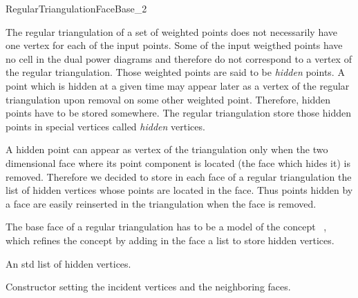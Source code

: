 

\begin{ccRefConcept}{RegularTriangulationFaceBase_2}


\ccDefinition
  
The regular triangulation of a set of weighted points does not
necessarily
have one vertex for each of the input points. Some of the input
weigthed points have no cell in the dual power diagrams
and therefore do not correspond to a vertex of the regular
triangulation.
Those weighted points are said to be {\it hidden} points.
A  point which is hidden at a given time may appear later as a vertex of
the regular triangulation upon removal on some other weighted point.
Therefore, hidden points have to be stored somewhere.
The regular triangulation store those hidden points
in special vertices called {\it hidden} vertices.

A hidden point can appear as vertex of the triangulation
only when the
two dimensional face where its point component is located
(the face which hides it)
is removed. Therefore we decided to store 
in each  face of a regular triangulation
the list of hidden vertices whose points are located in the face.
Thus  points hidden by a face are easily reinserted in the triangulation
when the face is removed.

The base face of a regular triangulation 
has to be a model
of the concept \ccRefName\ , which refines
the concept  by adding
in the face  a list to store hidden vertices.

\ccRefines
{}

\ccTypes
{}
{An std list of hidden vertices.}


\ccCreation
{}  %

\ccGlue
{}
\ccGlue
{} {Constructor setting the incident vertices and 
the neighboring faces.}


\end{ccRefConcept}
